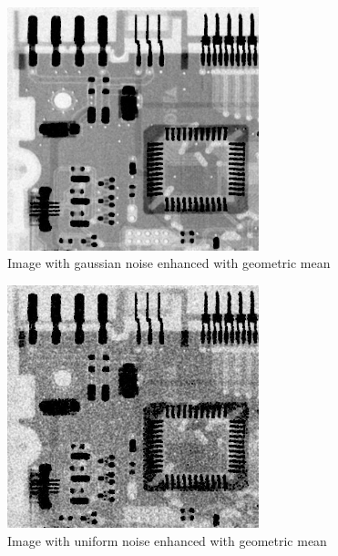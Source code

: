 \documentclass[10pt]{article}
\begin{document}
\begin{figure}[!ht]
	\centering
	\includegraphics[height=200pt]{./ex4/gaussgeo.jpg}
	\caption{Image with gaussian noise enhanced with geometric mean}
\end{figure}
\begin{figure}[!ht]
	\centering
	\includegraphics[height=200pt]{./ex4/unigeo.jpg}
	\caption{Image with uniform noise enhanced with geometric mean}
\end{figure}
\end{document}
